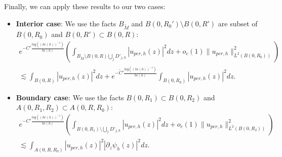\documentclass[leqno,11pt,letterpaper, english]{amsart}
\theoremstyle{plain}
\theoremstyle{definition}
\numberwithin{equation}{section}
\begin{document}
Finally, we can apply these results to our two cases:

\begin{itemize}
	\item \textbf{Interior case}:
	We use the facts $B_{\tilde{M}}$ and $B(0,R_0')\setminus B(0,R')$ are subset of $B(0,R_0)$ and $B(0,R')\subset B(0,R)$:
	\begin{multline}
		e^{-C' \frac{log((h\epsilon(h))^{-1})}{h\epsilon(h)}}\left(\int_{B_{\tilde{M}}\setminus B(0,R)\bigcup_j D'_{j,h}}  |u_{per,h}(z)|^2 dz +o_c(1)\|u_{per,h}\|_{L^2(B(0,R_0))}^2 \right) \\   
		 \lesssim \int_{B(0,R)} \left|u_{per,h}(z)\right|^2dz+e^{-\tilde{C}' \frac{log((h\epsilon(h))^{-1})}{h\epsilon(h)}}\int_{B(0,R_0)} \left|u_{per,h}(z)\right|^2dz.
	\end{multline}
	\item \textbf{Boundary case}: We use the facts  $B(0,R_1)\subset B(0,R_2)$ and $A(0,R_1,R_2)\subset A(0,R,R_0)$:
	\begin{multline}
		e^{-C'  \frac{log((h\epsilon(h))^{-1})}{h\epsilon(h)}}\left(\int_{B(0,R_1)\setminus \bigcup_j D'_{j,h}} |u_{per,h}(z)|^2 dz+ o_c(1) \|u_{per,h}\|_{L^2(B(0,R_2))}^2 \right) \\
		\lesssim \int_{A(0,R,R_0)} \left|u_{per,h}(z)\right|^2\left|\partial_z \psi_h\left(z\right)\right|^2dz.
	\end{multline}
\end{itemize}
\end{document}
